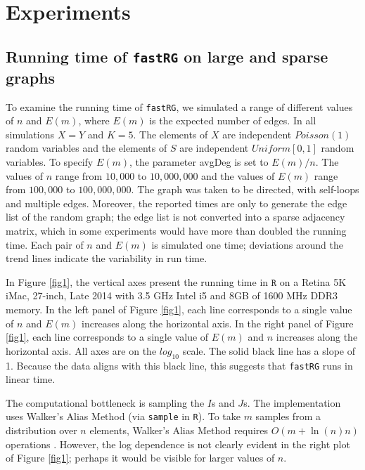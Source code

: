 \documentclass[twoside,11pt]{article}
\begin{document}
\section{Experiments}
\label{simulation}

\subsection{Running time of \texttt{fastRG} on large and sparse graphs}
%
To examine the running time of \texttt{fastRG}, we simulated a range of different values of $n$ and $E(m)$, where $E(m)$ is the expected number of edges.  In all simulations $X=Y$ and $K = 5$.  The elements of $X$ are independent $Poisson(1)$ random variables and the elements of $S$ are independent $Uniform[0,1]$ random variables.  To specify $E(m)$, the parameter avgDeg is set to $E(m)/n$. The values of $n$ range from $10,000$ to $10,000,000$ and the values of $E(m)$ range from $100,000$ to $100,000,000$.  The graph was taken to be directed, with self-loops and multiple edges.  Moreover, the reported times are only to generate the edge list of the random graph; the edge list is not converted into a sparse adjacency matrix, which in some experiments would have more than doubled the running time.  Each pair of $n$ and $E(m)$ is simulated one time; deviations around the trend lines indicate the variability in run time.  



In Figure \ref{fig1}, the vertical axes present the running time in $\texttt{R}$ on a Retina 5K iMac, 27-inch, Late 2014 with 3.5 GHz Intel i5 and 8GB of 1600 MHz DDR3 memory. In the left panel of Figure \ref{fig1}, each line corresponds to a single value of $n$ and $E(m)$ increases along the horizontal axis. In the right panel of Figure \ref{fig1}, each line corresponds to a single value of $E(m)$ and $n$ increases along the horizontal axis.  All axes are on the $log_{10}$ scale.  The solid black line has a slope of 1.  Because the data aligns with this black line, this suggests that \texttt{fastRG} runs in linear time.

The computational bottleneck is sampling the $I$s and $J$s. The implementation uses Walker's Alias Method \citep{walker1977efficient} (via \texttt{sample} in \texttt{R}).  To take $m$ samples from a distribution over $n$ elements, Walker's Alias Method  requires $O(m + \ln(n)n)$ operations  \citep{vose1991linear}.  
 However, the log dependence is not clearly evident in the right plot of Figure \ref{fig1}; perhaps it would be visible for larger values of $n$.
 
\end{document}
